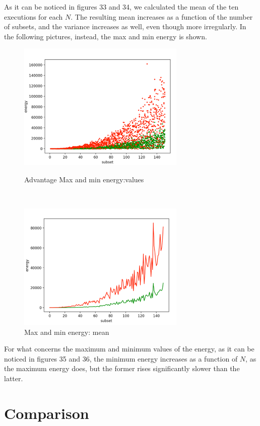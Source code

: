 \documentclass[oneside,a4paper]{article}
\begin{document}
As it can be noticed in figures 33 and 34, we calculated the mean of the ten executions for each $N$. The resulting mean increases as a function of the number of subsets, and the variance increases as well, even though more irregularly. In the following pictures, instead, the max and min energy is shown.
\newpage
\begin{figure}[htp]
\begin{minipage}[b]{8cm}
\centering
\includegraphics[width=8cm]{LaTeXTemplate/Images/MaxMinAdvValues.png}
\caption{Advantage Max and min energy:values}
\end{minipage}
\ \hspace{2mm} \hspace{2mm} \
\begin{minipage}[b]{8cm}
\centering
\includegraphics[width=8cm]{LaTeXTemplate/Images/MaxMinAdvMean.png}
\caption{Max and min energy: mean}
\end{minipage}
\end{figure}

For what concerns the maximum and minimum values of the energy, as it can be noticed in figures 35 and 36, the minimum energy increases as a function of $N$, as the maximum energy does, but the former rises significantly slower than the latter.

\section{Comparison}
\end{document}
